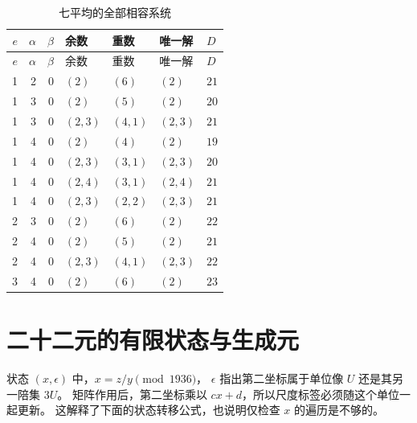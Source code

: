 \begin{longtable}{rrrllll}
\caption{七平均的全部相容系统}\label{tab:seven-data}\\
\toprule $e$&$\alpha$&$\beta$&余数&重数&唯一解&$D$\\\midrule\endfirsthead
\toprule $e$&$\alpha$&$\beta$&余数&重数&唯一解&$D$\\\midrule\endhead
1&2&0&$(2)$&$(6)$&$(2)$&$21$\\
1&3&0&$(2)$&$(5)$&$(2)$&$20$\\
1&3&0&$(2,3)$&$(4,1)$&$(2,3)$&$21$\\
1&4&0&$(2)$&$(4)$&$(2)$&$19$\\
1&4&0&$(2,3)$&$(3,1)$&$(2,3)$&$20$\\
1&4&0&$(2,4)$&$(3,1)$&$(2,4)$&$21$\\
1&4&0&$(2,3)$&$(2,2)$&$(2,3)$&$21$\\
2&3&0&$(2)$&$(6)$&$(2)$&$22$\\
2&4&0&$(2)$&$(5)$&$(2)$&$21$\\
2&4&0&$(2,3)$&$(4,1)$&$(2,3)$&$22$\\
3&4&0&$(2)$&$(6)$&$(2)$&$23$\\
\bottomrule\end{longtable}\endgroup



\section{二十二元的有限状态与生成元}
状态 $(x,\epsilon)$ 中，$x=z/y\pmod{1936}$，
$\epsilon$ 指出第二坐标属于单位像 $U$ 还是其另一陪集 $3U$。
矩阵作用后，第二坐标乘以 $cx+d$，所以尺度标签必须随这个单位一起更新。
这解释了下面的状态转移公式，也说明仅检查 $x$ 的遍历是不够的。

